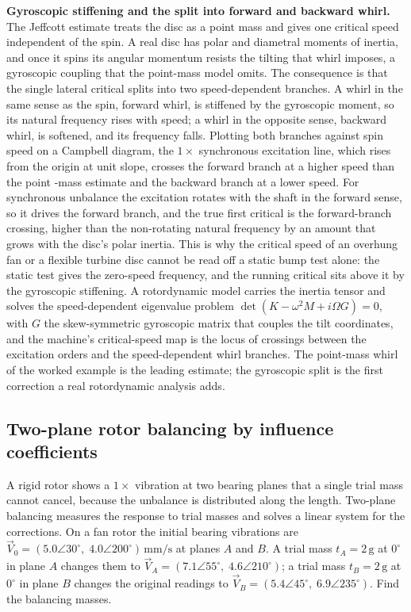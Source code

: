 \begin{mastery}
\textbf{Gyroscopic stiffening and the split into forward and backward
whirl.} The Jeffcott estimate treats the disc as a point mass and gives
one critical speed independent of the spin. A real disc has polar and
diametral moments of inertia, and once it spins its angular momentum
resists the tilting that whirl imposes, a gyroscopic coupling that the
point-mass model omits. The consequence is that the single lateral
critical splits into two speed-dependent branches. A whirl in the same
sense as the spin, forward whirl, is stiffened by the gyroscopic
moment, so its natural frequency rises with speed; a whirl in the
opposite sense, backward whirl, is softened, and its frequency falls.
Plotting both branches against spin speed on a Campbell diagram, the
$1\times$ synchronous excitation line, which rises from the origin at
unit slope, crosses the forward branch at a higher speed than the point
-mass estimate and the backward branch at a lower speed. For synchronous
unbalance the excitation rotates with the shaft in the forward sense, so
it drives the forward branch, and the true first critical is the
forward-branch crossing, higher than the non-rotating natural frequency
by an amount that grows with the disc's polar inertia. This is why the
critical speed of an overhung fan or a flexible turbine disc cannot be
read off a static bump test alone: the static test gives the
zero-speed frequency, and the running critical sits above it by the
gyroscopic stiffening. A rotordynamic model carries the inertia tensor
and solves the speed-dependent eigenvalue problem $\det(K - \omega^2 M +
i\Omega G) = 0$, with $G$ the skew-symmetric gyroscopic matrix that
couples the tilt coordinates, and the machine's critical-speed map is
the locus of crossings between the excitation orders and the
speed-dependent whirl branches. The point-mass whirl of the worked
example is the leading estimate; the gyroscopic split is the first
correction a real rotordynamic analysis adds.
\end{mastery}

\subsection{Two-plane rotor balancing by influence coefficients}

A rigid rotor shows a $1\times$ vibration at two bearing planes that a
single trial mass cannot cancel, because the unbalance is distributed
along the length. Two-plane balancing measures the response to trial
masses and solves a linear system for the corrections. On a fan rotor
the initial bearing vibrations are $\vec V_0 = (5.0\angle 30^\circ,\;
4.0\angle 200^\circ)\,\si{\milli\meter\per\second}$ at planes $A$ and
$B$. A trial mass $t_A = 2\,\si{\gram}$ at $0^\circ$ in plane $A$ changes
them to $\vec V_A = (7.1\angle 55^\circ,\; 4.6\angle 210^\circ)$; a
trial mass $t_B = 2\,\si{\gram}$ at $0^\circ$ in plane $B$ changes the
original readings to $\vec V_B = (5.4\angle 45^\circ,\; 6.9\angle
235^\circ)$. Find the balancing masses.

